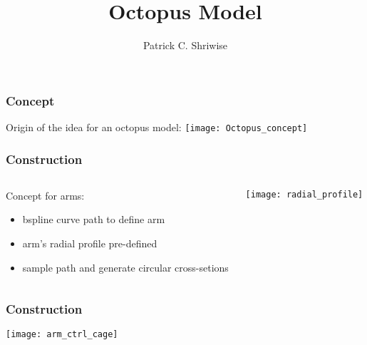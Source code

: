 \documentclass[14pt]{beamer}
\begin{document}
\graphicspath{ {./figures/} }

\title{Octopus Model}
\author{Patrick C. Shriwise}


\maketitle


\begin{frame}
\frametitle{Concept}
\begin{center}
Origin of the idea for an octopus model:
\vfill
\texttt{[image: Octopus\_concept]}
\end{center}

\end{frame}

\begin{frame}
\frametitle{Construction}

\begin{columns}[T]
\begin{column}{0.48\textwidth}
Concept for arms:
\begin{itemize}
\item bspline curve path to define arm
\item arm's radial profile pre-defined
\item sample path and generate circular cross-setions
\end{itemize}
\end{column}

\hfill

\begin{column}{0.48\textwidth}
\begin{center}
\texttt{[image: radial\_profile]}
\end{center}
\end{column}
\end{columns}

\end{frame}


\begin{frame}
\frametitle{Construction}

\begin{center}
\texttt{[image: arm\_ctrl\_cage]}
\end{center}

\end{frame}
\end{document}
